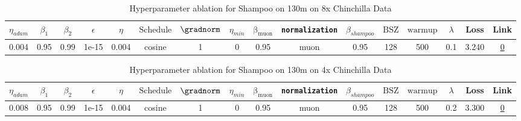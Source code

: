 \begin{table}[H]
\centering
\caption{Hyperparameter ablation for Shampoo on 130m on 8x Chinchilla Data}
\label{tab:ablation_shampoo_130m_8}
\begin{tabular}{cccccccccccccccc}
\toprule
$\eta_{adam}$ & $\beta_1$ & $\beta_2$ & $\epsilon$ & $\eta$ & $\mathrm{Schedule}$ & $\gradnorm$ & $\eta_{min}$ & $\mathrm{\beta_{muon}}$ & \texttt{normalization} & $\beta_{shampoo}$ & $\mathrm{BSZ}$ & $\mathrm{warmup}$ & $\lambda$ & Loss & Link \\
\midrule
0.004 & 0.95 & 0.99 & 1e-15 & 0.004 & cosine & 1 & 0 & 0.95 & muon & 0.95 & 128 & 500 & 0.1 & 3.240 & \href{https://wandb.ai/stanford-mercury/optimizer-scaling/runs/sweep-130m-21B-mudamk138b15lr0.004-alr0.004-wd0.1-minlr0-warmup5-239972}{0} \\
\midrule
\bottomrule
\end{tabular}
\end{table}

\begin{table}[H]
\centering
\caption{Hyperparameter ablation for Shampoo on 130m on 4x Chinchilla Data}
\label{tab:ablation_shampoo_130m_4}
\begin{tabular}{cccccccccccccccc}
\toprule
$\eta_{adam}$ & $\beta_1$ & $\beta_2$ & $\epsilon$ & $\eta$ & $\mathrm{Schedule}$ & $\gradnorm$ & $\eta_{min}$ & $\mathrm{\beta_{muon}}$ & \texttt{normalization} & $\beta_{shampoo}$ & $\mathrm{BSZ}$ & $\mathrm{warmup}$ & $\lambda$ & Loss & Link \\
\midrule
0.008 & 0.95 & 0.99 & 1e-15 & 0.004 & cosine & 1 & 0 & 0.95 & muon & 0.95 & 128 & 500 & 0.2 & 3.300 & \href{https://wandb.ai/stanford-mercury/optimizer-scaling/runs/sweep-130m-10B-mudamhcf2e65lr0.004-alr0.008-wd0.2-minlr0-warmup5-8614e7}{0} \\
\midrule
\bottomrule
\end{tabular}
\end{table}

